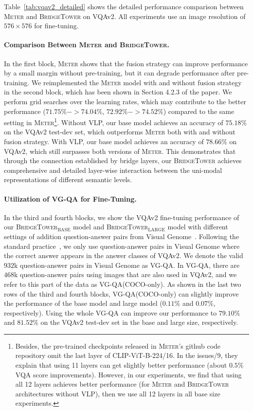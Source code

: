 \documentclass[letterpaper]{article} %
\newcommand{\methodname}[0]{\textsc{BridgeTower}}
\newcommand{\modelbase}[0]{$_{\text{BASE}}$}
\newcommand{\modellarge}[0]{$_{\text{LARGE}}$}
\newcommand{\metername}[0]{\textsc{Meter}}
\begin{document}
Table~\ref{tab:vqav2_detailed} shows the detailed performance comparison between \metername{} and \methodname{} on VQAv2.
All experiments use an image resolution of $576 \times 576$ for fine-tuning.

\paragraph{Comparison Between \metername{} and \methodname{}.}
In the first block, \metername{} shows that the fusion strategy can improve performance by a small margin without pre-training, but it can degrade performance after pre-training.
We reimplemented the \metername{} model with and without fusion strategy in the second block, which has been shown in Section 4.2.3 of the paper.
We perform grid searches over the learning rates, which may contribute to the better performance ($71.75\%$$-$$>$$74.04\%$, $72.92\%$$-$$>$$74.52\%$) compared to the same setting in \metername{}\footnote{Besides, the pre-trained checkpoints released in \metername{}'s github code repository omit the last layer of CLIP-ViT-B-224/16. In the issues/9, they explain that using 11 layers can get slightly better performance (about $0.5\%$ VQA score improvements). However, in our experiments, we find that using all 12 layers achieves better performance (for \metername{} and \methodname{} architectures without VLP), then we use all 12 layers in all base size experiments.}.
Without VLP, our base model achieves an accuracy of $75.18\%$ on the VQAv2 test-dev set, which outperforms \metername{} both with and without fusion strategy.
With VLP, our base model achieves an accuracy of $78.66\%$ on VQAv2, which still surpasses both versions of \metername{}.
This demonstrates that through the connection established by bridge layers, our \methodname{} achieves comprehensive and detailed layer-wise interaction between the uni-modal representations of different semantic levels.

\paragraph{Utilization of VG-QA for Fine-Tuning.}
In the third and fourth blocks, we show the VQAv2 fine-tuning performance of our \methodname{}\modelbase{} model and \methodname{}\modellarge{} model with different settings of addition question-answer pairs from Visual Genome~\citep{krishna2017visual}.
Following the standard practice~\citep{teney2018tips, Yu_2019_CVPR}, we only use question-answer pairs in Visual Genome where the correct answer appears in the answer classes of VQAv2. 
We denote the valid $932$k question-answer pairs in Visual Genome as VG-QA. 
In VG-QA, there are $468$k question-answer pairs using images that are also used in VQAv2, and we refer to this part of the data as VG-QA(COCO-only).
As shown in the last two rows of the third and fourth blocks, VG-QA(COCO-only) can slightly improve the performance of the base model and large model ($0.11\%$ and $0.07\%$, respectively). 
Using the whole VG-QA can improve our performance to $79.10\%$ and $81.52\%$ on the VQAv2 test-dev set in the base and large size, respectively.
\end{document}
